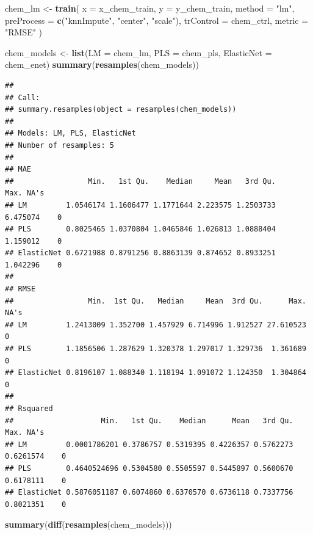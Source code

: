\documentclass[
  11pt,
]{article}
\newenvironment{Shaded}{\begin{snugshade}}{\end{snugshade}}
\newcommand{\AttributeTok}[1]{\textcolor[rgb]{0.13,0.29,0.53}{#1}}
\newcommand{\FunctionTok}[1]{\textcolor[rgb]{0.13,0.29,0.53}{\textbf{#1}}}
\newcommand{\NormalTok}[1]{#1}
\newcommand{\OtherTok}[1]{\textcolor[rgb]{0.56,0.35,0.01}{#1}}
\newcommand{\StringTok}[1]{\textcolor[rgb]{0.31,0.60,0.02}{#1}}
\begin{document}
\begin{Shaded}
\begin{Highlighting}[]
\NormalTok{chem\_lm }\OtherTok{\textless{}{-}} \FunctionTok{train}\NormalTok{(}
  \AttributeTok{x =}\NormalTok{ x\_chem\_train,}
  \AttributeTok{y =}\NormalTok{ y\_chem\_train,}
  \AttributeTok{method =} \StringTok{"lm"}\NormalTok{,}
  \AttributeTok{preProcess =} \FunctionTok{c}\NormalTok{(}\StringTok{"knnImpute"}\NormalTok{, }\StringTok{"center"}\NormalTok{, }\StringTok{"scale"}\NormalTok{),}
  \AttributeTok{trControl =}\NormalTok{ chem\_ctrl,}
  \AttributeTok{metric =} \StringTok{"RMSE"}
\NormalTok{)}

\NormalTok{chem\_models }\OtherTok{\textless{}{-}} \FunctionTok{list}\NormalTok{(}\AttributeTok{LM =}\NormalTok{ chem\_lm, }\AttributeTok{PLS =}\NormalTok{ chem\_pls, }\AttributeTok{ElasticNet =}\NormalTok{ chem\_enet)}
\FunctionTok{summary}\NormalTok{(}\FunctionTok{resamples}\NormalTok{(chem\_models))}
\end{Highlighting}
\end{Shaded}

\begin{verbatim}
## 
## Call:
## summary.resamples(object = resamples(chem_models))
## 
## Models: LM, PLS, ElasticNet 
## Number of resamples: 5 
## 
## MAE 
##                 Min.   1st Qu.    Median     Mean   3rd Qu.     Max. NA's
## LM         1.0546174 1.1606477 1.1771644 2.223575 1.2503733 6.475074    0
## PLS        0.8025465 1.0370804 1.0465846 1.026813 1.0888404 1.159012    0
## ElasticNet 0.6721988 0.8791256 0.8863139 0.874652 0.8933251 1.042296    0
## 
## RMSE 
##                 Min.  1st Qu.   Median     Mean  3rd Qu.      Max. NA's
## LM         1.2413009 1.352700 1.457929 6.714996 1.912527 27.610523    0
## PLS        1.1856506 1.287629 1.320378 1.297017 1.329736  1.361689    0
## ElasticNet 0.8196107 1.088340 1.118194 1.091072 1.124350  1.304864    0
## 
## Rsquared 
##                    Min.   1st Qu.    Median      Mean   3rd Qu.      Max. NA's
## LM         0.0001786201 0.3786757 0.5319395 0.4226357 0.5762273 0.6261574    0
## PLS        0.4640524696 0.5304580 0.5505597 0.5445897 0.5600670 0.6178111    0
## ElasticNet 0.5876051187 0.6074860 0.6370570 0.6736118 0.7337756 0.8021351    0
\end{verbatim}

\begin{Shaded}
\begin{Highlighting}[]
\FunctionTok{summary}\NormalTok{(}\FunctionTok{diff}\NormalTok{(}\FunctionTok{resamples}\NormalTok{(chem\_models)))}
\end{Highlighting}
\end{Shaded}
\end{document}
